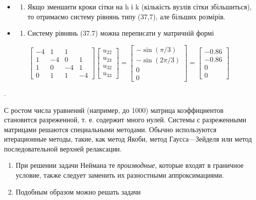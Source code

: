 \documentclass[
  ukrainian,
]{article}
\providecommand{\tightlist}{%
  \setlength{\itemsep}{0pt}\setlength{\parskip}{0pt}}
\begin{document}
\begin{itemize}
\tightlist
\item
  \begin{enumerate}
  \def\labelenumi{\arabic{enumi}.}
  \setcounter{enumi}{1}
  \tightlist
  \item
    Якщо зменшити кроки сітки на h і k (кількість вузлів сітки
    збільшиться), то отримаємо систему рівнянь типу (37,7), але більших
    розмірів.
  \end{enumerate}
\item
  \begin{enumerate}
  \def\labelenumi{\arabic{enumi}.}
  \setcounter{enumi}{2}
  \tightlist
  \item
    Систему рівнянь (37.7) можна переписати у матричній формі
  \end{enumerate}
\end{itemize}

\[
\begin{bmatrix} -4 & 1 & 1 \\ 1 & -4 & 0 & 1 \\ 1 & 0 & -4 & 1 \\ 0 & 1 & 1 & -4 \end{bmatrix}
\begin{bmatrix} u_{22} \\ u_{23} \\ u_{32} \\ u_{33} \end{bmatrix}
=
\begin{bmatrix} -\sin{(\pi/3)} \\ -\sin{(2\pi/3)} \\ 0 \\ 0 \end{bmatrix}
=
\begin{bmatrix} -0.86 \\ -0.86 \\ 0 \\ 0 \end{bmatrix}
\]

.

С ростом числа уравнений (например, до 1000) матрица коэффициентов
становится разреженной, т. е. содержит много нулей. Системы с
разреженными матрицами решаются специальными методами. Обычно
используются итерационные методы, такие, как метод Якоби, метод
Гаусса---Зейделя или метод последовательной верхней релаксации.

\begin{enumerate}
\def\labelenumi{\arabic{enumi}.}
\setcounter{enumi}{3}
\item
  При решении задачи Неймана те \emph{производные}, которые входят в
  граничное условие, также следует заменить их разностными
  аппроксимациями.
\item
  Подобным образом можно решать задачи
\end{enumerate}
\end{document}
